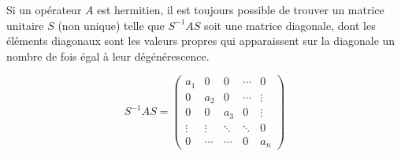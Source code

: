 \colorbox[gray]{0.8}{
\parbox[c]{0.9\textwidth}{
\begin{theorem}
Si un opérateur $A$ est hermitien, il est toujours possible de trouver un
matrice unitaire $S$ (non unique) telle que $S^{-1}AS$ soit une matrice
diagonale, dont les éléments diagonaux sont les valeurs propres qui apparaissent
sur la diagonale un nombre de fois égal à leur dégénérescence.

\begin{equation}
S^{-1}AS=\begin{pmatrix}
a_1 & 0 & 0 & \cdots & 0\\
0 & a_{2} & 0 & \cdots & \vdots\\
0 & 0 & a_3 & 0 & \vdots\\
\vdots& \vdots &  \ddots&  \ddots& 0\\
0 & \cdots & \cdots & 0 & a_{n}
\end{pmatrix}
\end{equation}
\end{theorem}
}}\medskip

